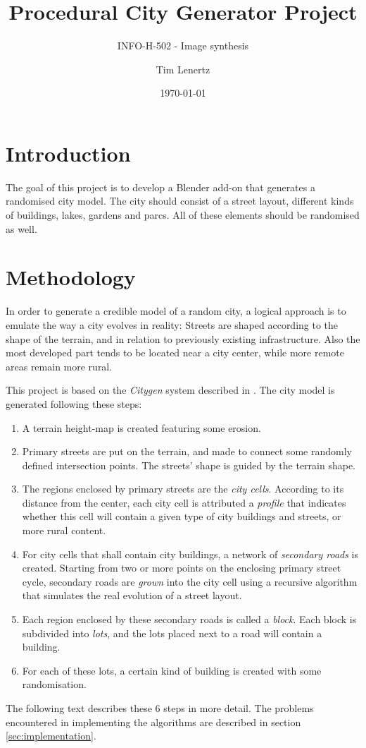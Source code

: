 \documentclass[a4paper,12pt]{scrartcl}
\begin{document}
\titlehead{Université Libre de Bruxelles}
\title{Procedural City Generator Project}
\subtitle{INFO-H-502 - Image synthesis}
\author{Tim Lenertz}
\date{\today}
\maketitle

\section{Introduction}
The goal of this project is to develop a Blender add-on that generates a randomised city model. The city should consist of a street layout, different kinds of buildings, lakes, gardens and parcs. All of these elements should be randomised as well.

\section{Methodology}
In order to generate a credible model of a random city, a logical approach is to emulate the way a city evolves in reality: Streets are shaped according to the shape of the terrain, and in relation to previously existing infrastructure. Also the most developed part tends to be located near a city center, while more remote areas remain more rural.

This project is based on the \emph{Citygen} system described in \cite{Kell2007}. The city model is generated following these steps:
\begin{enumerate}
\item A terrain height-map is created featuring some erosion.
\item Primary streets are put on the terrain, and made to connect some randomly defined intersection points. The streets' shape is guided by the terrain shape.
\item The regions enclosed by primary streets are the \emph{city cells}. According to its distance from the center, each city cell is attributed a \emph{profile} that indicates whether this cell will contain a given type of city buildings and streets, or more rural content.
\item For city cells that shall contain city buildings, a network of \emph{secondary roads} is created. Starting from two or more points on the enclosing primary street cycle, secondary roads are \emph{grown} into the city cell using a recursive algorithm that simulates the real evolution of a street layout.
\item Each region enclosed by these secondary roads is called a \emph{block}. Each block is subdivided into \emph{lots}, and the lots placed next to a road will contain a building.
\item For each of these lots, a certain kind of building is created with some randomisation.
\end{enumerate}
The following text describes these 6 steps in more detail. The problems encountered in implementing the algorithms are described in section \ref{sec:implementation}.
\end{document}
